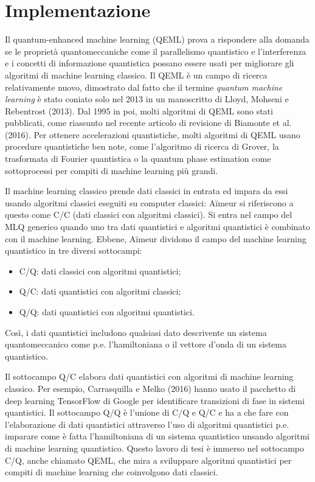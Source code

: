 \chapter{Implementazione}\label{ch:implementazione}

Il quantum-enhanced machine learning (QEML) prova a rispondere alla domanda 
se le proprietà quantomeccaniche come il parallelismo quantistico e 
l'interferenza e i concetti di informazione quantistica possano essere usati 
per migliorare gli algoritmi di machine learning classico. Il QEML è un campo 
di ricerca relativamente nuovo, dimostrato dal fatto che il termine 
\emph{quantum machine learning} è stato coniato solo nel 2013 in un manoscritto 
di Lloyd, Mohseni e Rebentrost (2013). %
Dal 1995 in poi, molti algoritmi di QEML sono stati pubblicati, come riassunto 
nel recente articolo di revisione di Biamonte et al. (2016). %
Per ottenere accelerazioni quantistiche, molti algoritmi di QEML usano procedure
quantistiche ben note, come l'algoritmo di ricerca di Grover, la trasformata di 
Fourier quantistica o la quantum phase estimation come sottoprocessi per compiti
di machine learning più grandi. %

Il machine learning classico prende dati classici in entrata ed impara da essi 
usando algoritmi classici eseguiti su computer classici: Aïmeur %
si riferiscono a questo come C/C (dati classici con algoritmi classici). 
Si entra nel campo del \ac{MLQ} generico quando uno tra dati quantistici e 
algoritmi quantistici è combinato con il machine learning. Ebbene, Aïmeur 
dividono il campo del machine learning quantistico in tre diversi sottocampi: 
\begin{itemize}
    \item C/Q: dati classici con algoritmi quantistici;
    \item Q/C: dati quantistici con algoritmi classici;
    \item Q/Q: dati quantistici con algoritmi quantistici.
\end{itemize}
Così, i dati quantistici includono qualsiasi dato descrivente un sistema 
quantomeccanico come p.e. l'hamiltoniana o il vettore d'onda di un sistema 
quantistico.

Il sottocampo Q/C elabora dati quantistici con algoritmi di machine learning 
classico. Per esempio, Carrasquilla e Melko (2016) %
hanno usato il pacchetto di deep learning TensorFlow di Google per identificare 
transizioni di fase in sistemi quantistici. Il sottocampo Q/Q è l'unione di 
C/Q e Q/C e ha a che fare con l'elaborazione di dati quantistici attraverso 
l'uso di algoritmi quantistici p.e. imparare come è fatta l'hamiltoniana di un 
sistema quantistico unsando algoritmi di machine learning quantistico. Questo 
lavoro di tesi è immerso nel sottocampo C/Q, anche chiamato QEML, che mira a 
sviluppare algoritmi quantistici per compiti di machine learning che coinvolgono 
dati classici. 

